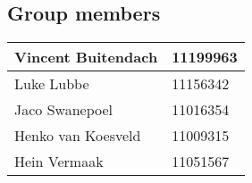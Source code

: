 \begin{center}
\vfill
\section{Group members}

\begin{tabular}{|l|l|}

\hline
Vincent Buitendach & 11199963\\
\hline
Luke Lubbe & 11156342\\
\hline
Jaco Swanepoel & 11016354\\
\hline
Henko van Koesveld & 11009315\\
\hline
Hein Vermaak & 11051567\\
\hline

\end{tabular}

\end{center}

